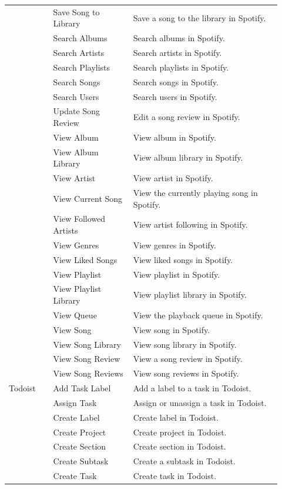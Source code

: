 \documentclass{llmxive}
\begin{document}
\begin{longtable}{@{}p{0.15\linewidth}p{0.27\linewidth}p{0.50\linewidth}@{}}
 & Save Song to Library & Save a song to the library in Spotify. \\
 & Search Albums & Search albums in Spotify. \\
 & Search Artists & Search artists in Spotify. \\
 & Search Playlists & Search playlists in Spotify. \\
 & Search Songs & Search songs in Spotify. \\
 & Search Users & Search users in Spotify. \\
 & Update Song Review & Edit a song review in Spotify. \\
 & View Album & View album in Spotify. \\
 & View Album Library & View album library in Spotify. \\
 & View Artist & View artist in Spotify. \\
 & View Current Song & View the currently playing song in Spotify. \\
 & View Followed Artists & View artist following in Spotify. \\
 & View Genres & View genres in Spotify. \\
 & View Liked Songs & View liked songs in Spotify. \\
 & View Playlist & View playlist in Spotify. \\
 & View Playlist Library & View playlist library in Spotify. \\
 & View Queue & View the playback queue in Spotify. \\
 & View Song & View song in Spotify. \\
 & View Song Library & View song library in Spotify. \\
 & View Song Review & View a song review in Spotify. \\
 & View Song Reviews & View song reviews in Spotify. \\
\midrule
Todoist & Add Task Label & Add a label to a task in Todoist. \\
 & Assign Task & Assign or unassign a task in Todoist. \\
 & Create Label & Create label in Todoist. \\
 & Create Project & Create project in Todoist. \\
 & Create Section & Create section in Todoist. \\
 & Create Subtask & Create a subtask in Todoist. \\
 & Create Task & Create task in Todoist. \\

\end{longtable}
\end{document}

